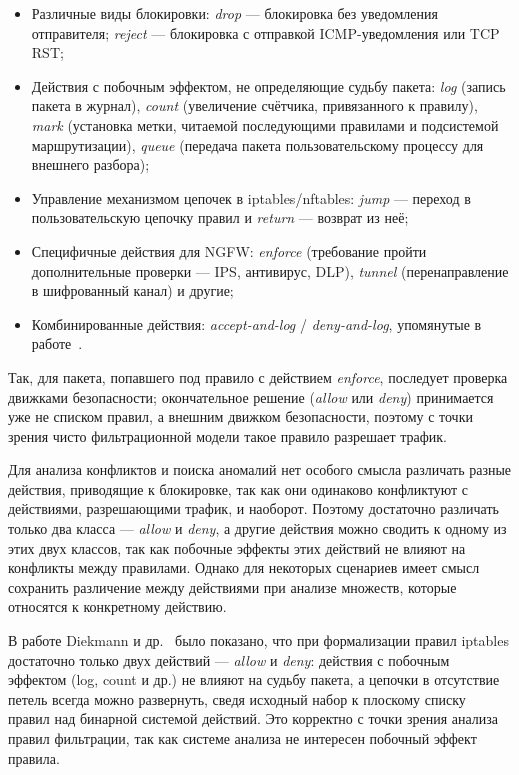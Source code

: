 \begin{itemize}
    \item Различные виды блокировки: \emph{drop} --- блокировка без уведомления отправителя; \emph{reject} --- блокировка с отправкой ICMP-уведомления или TCP RST;
    \item Действия с побочным эффектом, не определяющие судьбу пакета: \emph{log} (запись пакета в журнал), \emph{count} (увеличение счётчика, привязанного к правилу), \emph{mark} (установка метки, читаемой последующими правилами и подсистемой маршрутизации), \emph{queue} (передача пакета пользовательскому процессу для внешнего разбора);
    \item Управление механизмом цепочек в iptables/nftables: \emph{jump} --- переход в пользовательскую цепочку правил и \emph{return} --- возврат из неё;
    \item Специфичные действия для NGFW: \emph{enforce} (требование пройти дополнительные проверки --- IPS, антивирус, DLP), \emph{tunnel} (перенаправление в шифрованный канал) и другие;
    \item Комбинированные действия: \emph{accept-and-log} / \emph{deny-and-log}, упомянутые в работе~\cite{gouda2004firewall}.
\end{itemize}

Так, для пакета, попавшего под правило с действием \emph{enforce}, последует проверка движками безопасности; окончательное решение (\emph{allow} или \emph{deny}) принимается уже не списком правил, а внешним движком безопасности, поэтому с точки зрения чисто фильтрационной модели такое правило разрешает трафик.

Для анализа конфликтов и поиска аномалий нет особого смысла различать разные действия, приводящие к блокировке, так как они одинаково конфликтуют с действиями, разрешающими трафик, и наоборот. Поэтому достаточно различать только два класса --- \emph{allow} и \emph{deny}, а другие действия можно сводить к одному из этих двух классов, так как побочные эффекты этих действий не влияют на конфликты между правилами. Однако для некоторых сценариев имеет смысл сохранить различение между действиями при анализе множеств, которые относятся к конкретному действию.

В работе Diekmann и др.~\cite{diekmann2018verified} было показано, что при формализации правил iptables достаточно только двух действий --- \emph{allow} и \emph{deny}: действия с побочным эффектом (log, count и др.) не влияют на судьбу пакета, а цепочки в отсутствие петель всегда можно развернуть, сведя исходный набор к плоскому списку правил над бинарной системой действий. Это корректно с точки зрения анализа правил фильтрации, так как системе анализа не интересен побочный эффект правила.

